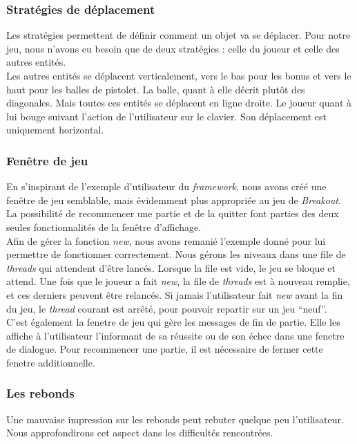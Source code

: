 \documentclass[a4paper,10pt]{article}
\begin{document}
    \subsubsection{Stratégies de déplacement}
        Les stratégies permettent de définir comment un objet va se déplacer. Pour notre jeu, nous n'avons eu besoin
        que de deux stratégies  : celle du joueur et celle des autres entités. \\ Les autres entités
        se déplacent verticalement, vers le bas pour les bonus et vers le haut pour les balles de pistolet. La balle, quant
        à elle décrit plutôt des diagonales. Mais toutes ces entités se déplacent en ligne droite.
        Le joueur quant à lui bouge suivant l'action de l'utilisateur sur le clavier. Son déplacement est uniquement horizontal.

    \subsubsection{Fenêtre de jeu}
        En s'inspirant de l'exemple d'utilisateur du \textit{framework}, nous avons créé une fenêtre de jeu semblable,
        mais évidemment plus appropriée au jeu de \textit{Breakout}. La possibilité de recommencer une partie et de la quitter
        font parties des deux seules fonctionnalités de la fenêtre d'affichage. \\

        Afin de gérer la fonction \textit{new}, nous avons remanié l'exemple donné pour lui permettre de fonctionner
        correctement. Nous gérons les niveaux dans une file de \textit{threads} qui attendent d'être lancés. Lorsque la file
        est vide, le jeu se bloque et attend. Une fois que le joueur a fait \textit{new}, la file de \textit{threads} est
        à nouveau remplie, et ces derniers peuvent être relancés. Si jamais l'utilisateur fait \textit{new} avant
        la fin du jeu, le \textit{thread} courant est arrêté, pour pouvoir repartir sur un jeu ``neuf''. \\

        C'est également la fenetre de jeu qui gère les messages de fin de partie. Elle les affiche à l'utilisateur
        l'informant de sa réussite ou de son échec dans une fenetre de dialogue. Pour recommencer une partie, il
        est nécessaire de fermer cette fenetre additionnelle.

    \subsubsection{Les rebonds}
        Une mauvaise impression sur les rebonds peut rebuter quelque peu l'utilisateur. Nous approfondirons
        cet aspect dans les difficultés rencontrées.
\end{document}
